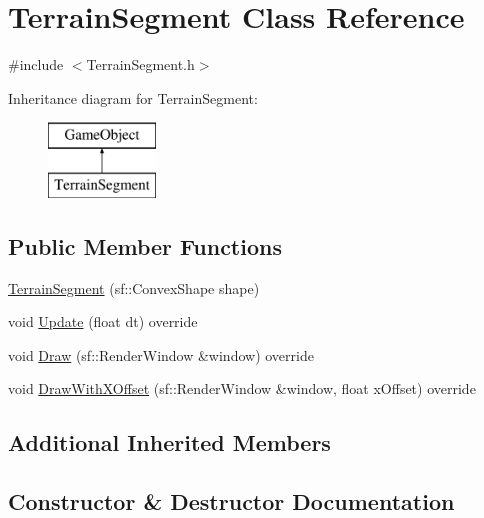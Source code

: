 \hypertarget{class_terrain_segment}{}\section{Terrain\+Segment Class Reference}
\label{class_terrain_segment}


{\ttfamily \#include $<$Terrain\+Segment.\+h$>$}

Inheritance diagram for Terrain\+Segment\+:\begin{figure}[H]
\begin{center}
\leavevmode
\includegraphics[height=2.000000cm]{class_terrain_segment}
\end{center}
\end{figure}
\subsection*{Public Member Functions}
\begin{DoxyCompactItemize}
\item 
\hyperlink{class_terrain_segment_a01bf8e0e9748e5828425112b74fe9417}{Terrain\+Segment} (sf\+::\+Convex\+Shape shape)
\item 
void \hyperlink{class_terrain_segment_ac8a610b8011a973e775b0cf205ba473a}{Update} (float dt) override
\item 
void \hyperlink{class_terrain_segment_a288c66908f5eaf7974424f64a95d9a9a}{Draw} (sf\+::\+Render\+Window \&window) override
\item 
void \hyperlink{class_terrain_segment_ad9832f83e328b50f647bb844846fb095}{Draw\+With\+X\+Offset} (sf\+::\+Render\+Window \&window, float x\+Offset) override
\end{DoxyCompactItemize}
\subsection*{Additional Inherited Members}


\subsection{Constructor \& Destructor Documentation}
\hypertarget{class_terrain_segment_a01bf8e0e9748e5828425112b74fe9417}{}\label{class_terrain_segment_a01bf8e0e9748e5828425112b74fe9417} 
